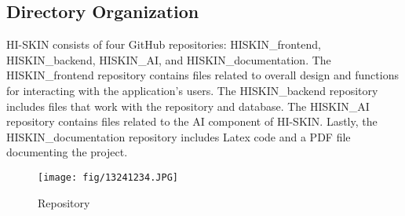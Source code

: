 \documentclass[conference]{IEEEtran}
\begin{document}
\subsection{Directory Organization}
HI-SKIN consists of four GitHub repositories: HISKIN\_frontend, HISKIN\_backend, HISKIN\_AI, and HISKIN\_documentation. The HISKIN\_frontend repository contains files related to overall design and functions for interacting with the application's users. The HISKIN\_backend repository includes files that work with the repository and database. The HISKIN\_AI repository contains files related to the AI component of HI-SKIN. Lastly, the HISKIN\_documentation repository includes Latex code and a PDF file documenting the project.  \\
\begin{figure}[h]
    \centering
    \texttt{[image: fig/13241234.JPG]}
    \label{fig:Repository}
    \caption{Repository} 
    \end{figure}
\end{document}
